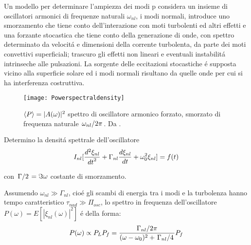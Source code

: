 \documentclass[../main.tex]{subfiles}
\begin{document}
Un modello per determinare l'ampiezza dei modi p considera un insieme di oscillatori armonici di frequenze naturali $\omega_{nl}$, i modi normali, introduce uno smorzamento che tiene conto dell'interazione con moti turbolenti ed altri effetti e una forzante stocastica che tiene conto della generazione di onde, con spettro determinato da velocit\'a e dimensioni della corrente turbolenta, da parte dei moti convettivi superficiali; trascuro gli effetti non lineari e eventuali instabilit\'a intrinseche alle pulsazioni. La sorgente delle eccitazioni stocastiche \'e supposta vicino alla superficie solare ed i modi normali risultano da quelle onde per cui si ha interferenza costruttiva.

\begin{wrapfigure}[25]{r}{0.4\textwidth}
\centering
\texttt{[image: Powerspectraldensity]}
\caption{$\exv{P}=|A(\omega)|^2$ spettro di oscillatore armonico forzato, smorzato di frequenza naturale $\midfrac{\omega_{nl}}{2\pi}$. Da \cite{houdek2006stochastic}.}\label{fig:Powerspectraldensity}
\end{wrapfigure}


Determino la densit\'a spettrale dell'oscillatore
\begin{equation}
I_{nl}[\TtwoDy{t}{\xi_{nl}}+\Gamma_{nl}\TDy{t}{\xi_{nl}}+\omega_0^2\xi_{nl}]=f(t)
\end{equation}

con $\midfrac{\Gamma}{2}=\Im{\omega}$ costante di smorzamento.

Assumendo $\omega_{nl}\gg\Gamma_{nl}$, cio\'e gli scambi di energia tra i modi e la turbolenza hanno tempo caratteristico $\tau_{nad}\gg\Pi_{osc}$, lo spettro in frequenza dell'oscillatore $P(\omega)=E[|\xi_{nl}(\omega)|^2]$ \'e della forma:
\begin{equation}
P(\omega)\propto P_LP_f=\frac{\midfrac{\Gamma_{nl}}{2\pi}}{(\omega-\omega_0)^2+\midfrac{\Gamma_{nl}}{4}}P_f
\end{equation}

\end{document}
